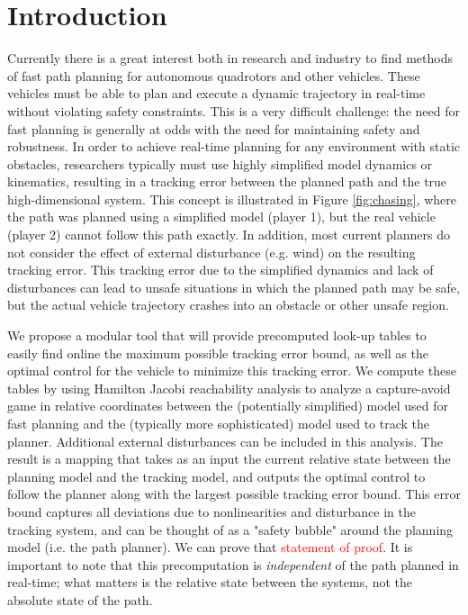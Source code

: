 \section{Introduction}
 Currently there is a great interest both in research and industry to find methods of fast path planning for autonomous quadrotors and other vehicles. These vehicles must be able to plan and execute a dynamic trajectory in real-time without violating safety constraints. This is a very difficult challenge: the need for fast planning is generally at odds with the need for maintaining safety and robustness. In order to achieve real-time planning for any environment with static obstacles, researchers typically must use highly simplified model dynamics or kinematics, resulting in a tracking error between the planned path and the true high-dimensional system. This concept is illustrated in Figure \ref{fig:chasing}, where the path was planned using a simplified model (player 1), but the real vehicle (player 2) cannot follow this path exactly. In addition, most current planners do not consider the effect of external disturbance (e.g. wind) on the resulting tracking error. This tracking error due to the simplified dynamics and lack of disturbances can lead to unsafe situations in which the planned path may be safe, but the actual vehicle trajectory crashes into an obstacle or other unsafe region.

We propose a modular tool that will provide precomputed look-up tables to easily find online the maximum possible tracking error bound, as well as the optimal control for the vehicle to minimize this tracking error. We compute these tables by using Hamilton Jacobi reachability analysis to analyze a capture-avoid game in relative coordinates between the (potentially simplified) model used for fast planning and the (typically more sophisticated) model used to track the planner. Additional external disturbances can be included in this analysis. The result is a mapping that takes as an input the current relative state between the planning model and the tracking model, and outputs the optimal control to follow the planner along with the largest possible tracking error bound. This error bound captures all deviations due to nonlinearities and disturbance in the tracking system, and can be thought of as a "safety bubble" around the planning model (i.e. the path planner). We can prove that \textcolor{red}{statement of proof}. It is important to note that this precomputation is \textit{independent} of the path planned in real-time; what matters is the relative state between the systems, not the absolute state of the path. 

